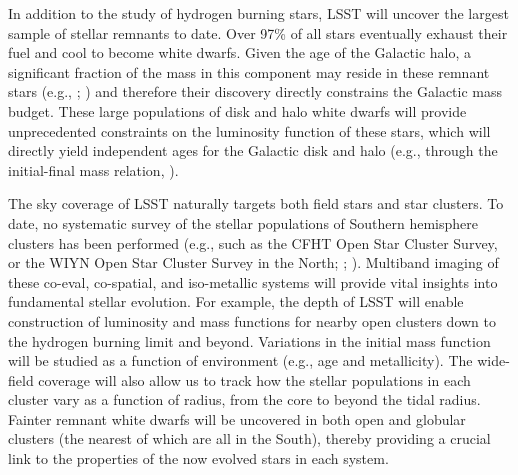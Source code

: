 
In addition to the study of hydrogen burning stars, LSST will uncover the largest sample of stellar remnants to date.
Over 97\% of all stars eventually exhaust their fuel and cool to become white dwarfs. Given the age of the Galactic
halo, a significant fraction of the mass in this component may reside in these remnant stars (e.g., \cite{2000ApJ...542..281A};
\cite{2007A&A...469..387T}) and therefore their discovery directly constrains the Galactic mass budget.  These large
populations of disk and halo white dwarfs will provide unprecedented constraints on the luminosity function of
these stars, which will directly yield independent ages for the Galactic disk and halo (e.g., through the initial-final mass
relation, \cite{2008ApJ...676..594K}).

The sky coverage of LSST naturally targets both field stars and star clusters.  To date, no systematic survey of the stellar
populations of Southern hemisphere clusters has been performed (e.g., such as the CFHT Open Star Cluster Survey, or
the WIYN Open Star Cluster Survey in the North; \cite{2001AJ....122..257K}; \cite{2000ASPC..198..517M}).  Multiband imaging of these co-eval,
co-spatial, and iso-metallic systems will provide vital insights into fundamental stellar evolution.  For example, the depth
of LSST will enable construction of  luminosity and mass functions for nearby open clusters down to the hydrogen burning
limit and beyond.  Variations in the initial mass function will be studied as a function of environment (e.g., age and metallicity).
The wide-field coverage will also allow us to track how the stellar populations in each cluster vary as a function of radius,
from the core to beyond the tidal radius. Fainter remnant white dwarfs will be uncovered in both open and globular clusters
(the nearest of which are all in the South), thereby providing a crucial link to the properties of the now evolved stars in each
system.



